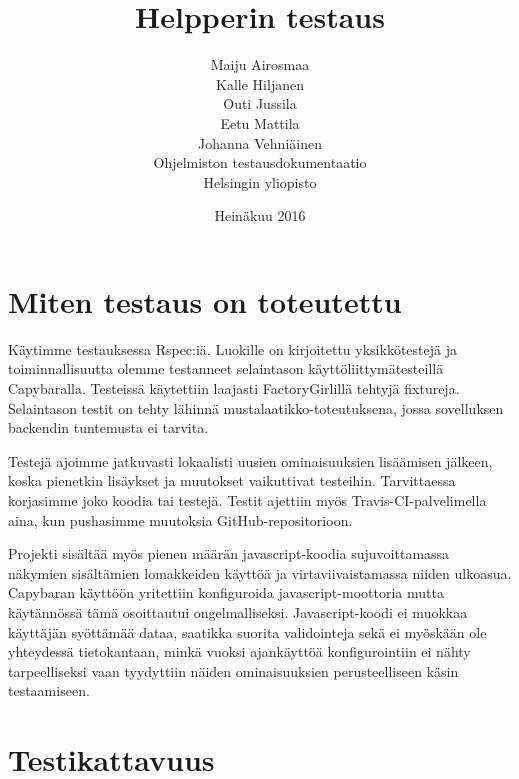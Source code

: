 \documentclass[a4paper,12pt, titlepage]{article}
\title{Helpperin testaus}
\author{ Maiju Airosmaa \\ Kalle Hiljanen \\
Outi Jussila \\ Eetu Mattila \\ Johanna Vehniäinen \\[1cm] Ohjelmiston testausdokumentaatio \\ Helsingin yliopisto}
\date{Heinäkuu 2016}
\begin{document}
\maketitle

\newpage
\tableofcontents
\newpage

\section{Miten testaus on toteutettu}

Käytimme testauksessa Rspec:iä. Luokille on kirjoitettu yksikkötestejä ja toiminnallisuutta olemme testanneet selaintason käyttöliittymätesteillä Capybaralla. Testeissä käytettiin laajasti FactoryGirlillä tehtyjä fixtureja. Selaintason testit on tehty lähinnä mustalaatikko-toteutuksena, jossa sovelluksen backendin tuntemusta ei tarvita.

Testejä ajoimme jatkuvasti lokaalisti uusien ominaisuuksien lisäämisen jälkeen, koska pienetkin lisäykset ja muutokset vaikuttivat testeihin. Tarvittaessa korjasimme joko koodia tai testejä. Testit ajettiin myös Travis-CI-palvelimella aina, kun pushasimme muutoksia GitHub-repositorioon.

Projekti sisältää myös pienen määrän javascript-koodia sujuvoittamassa näkymien sisältämien lomakkeiden käyttöä ja virtaviivaistamassa niiden ulkoasua. Capybaran käyttöön yritettiin konfiguroida javascript-moottoria mutta käytännössä tämä osoittautui ongelmalliseksi. Javascript-koodi ei muokkaa käyttäjän syöttämää dataa, saatikka suorita validointeja sekä ei myöskään ole yhteydessä tietokantaan, minkä vuoksi ajankäyttöä konfigurointiin ei nähty tarpeelliseksi vaan tyydyttiin näiden ominaisuuksien perusteelliseen käsin testaamiseen. 

\section{Testikattavuus}
\end{document}
